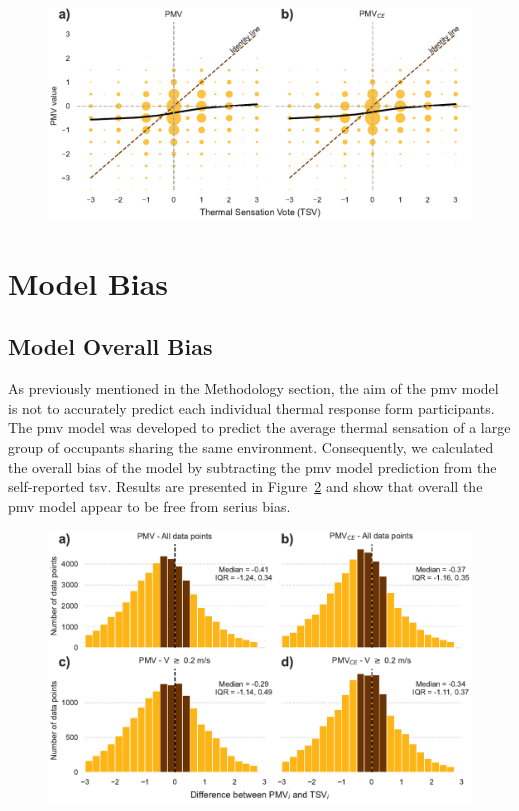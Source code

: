 \begin{figure}[htb!]
    \centering
    \includegraphics[width=\textwidth]{figures/bubble_models_vs_tsv}
    \caption{}
    \label{fig:bubble_models_vs_tsv}
\end{figure}

\section{Model Bias}\label{sec:model-bias}
\subsection{Model Overall Bias}\label{subsec:model-overall-bias}
As previously mentioned in the Methodology section, the aim of the \ac{pmv} model is not to accurately predict each individual thermal response form participants.
The \ac{pmv} model was developed to predict the average thermal sensation of a large group of occupants sharing the same environment.
Consequently, we calculated the overall bias of the model by subtracting the \ac{pmv} model prediction from the self-reported \ac{tsv}.
Results are presented in Figure~\ref{fig:hist_discrepancies} and show that overall the \ac{pmv} model appear to be free from serius bias.


\begin{figure}[htb!]
    \centering
    \includegraphics[width=\textwidth]{figures/hist_discrepancies}
    \caption{}
    \label{fig:hist_discrepancies}
\end{figure}

